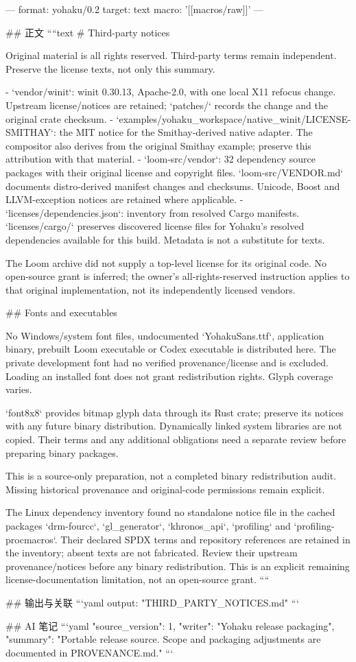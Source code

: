 ---
format: yohaku/0.2
target: text
macro: '[[macros/raw]]'
---

## 正文
````text
# Third-party notices

Original material is all rights reserved. Third-party terms remain independent.
Preserve the license texts, not only this summary.

- `vendor/winit`: winit 0.30.13, Apache-2.0, with one local X11 refocus change.
  Upstream license/notices are retained; `patches/` records the change and the
  original crate checksum.
- `examples/yohaku_workspace/native_winit/LICENSE-SMITHAY`: the MIT notice for
  the Smithay-derived native adapter. The compositor also derives from the
  original Smithay example; preserve this attribution with that material.
- `loom-src/vendor`: 32 dependency source packages with their original license
  and copyright files. `loom-src/VENDOR.md` documents distro-derived manifest
  changes and checksums. Unicode, Boost and LLVM-exception notices are retained
  where applicable.
- `licenses/dependencies.json`: inventory from resolved Cargo manifests.
  `licenses/cargo/` preserves discovered license files for Yohaku's resolved
  dependencies available for this build. Metadata is not a substitute for texts.

The Loom archive did not supply a top-level license for its original code.
No open-source grant is inferred; the owner's all-rights-reserved instruction
applies to that original implementation, not its independently licensed vendors.

## Fonts and executables

No Windows/system font files, undocumented `YohakuSans.ttf`, application binary,
prebuilt Loom executable or Codex executable is distributed here. The private
development font had no verified provenance/license and is excluded. Loading
an installed font does not grant redistribution rights. Glyph coverage varies.

`font8x8` provides bitmap glyph data through its Rust crate; preserve its notices
with any future binary distribution. Dynamically linked system libraries are
not copied. Their terms and any additional obligations need a separate review
before preparing binary packages.

This is a source-only preparation, not a completed binary redistribution audit.
Missing historical provenance and original-code permissions remain explicit.

The Linux dependency inventory found no standalone notice file in the cached
packages `drm-fourcc`, `gl_generator`, `khronos_api`, `profiling` and
`profiling-procmacros`. Their declared SPDX terms and repository references are
retained in the inventory; absent texts are not fabricated. Review their
upstream provenance/notices before any binary redistribution. This is an
explicit remaining license-documentation limitation, not an open-source grant.
````

## 输出与关联
```yaml
output: "THIRD_PARTY_NOTICES.md"
```

## AI 笔记
```yaml
{"source_version": 1, "writer": "Yohaku release packaging", "summary": "Portable release source. Scope and packaging adjustments are documented in PROVENANCE.md."}
```
